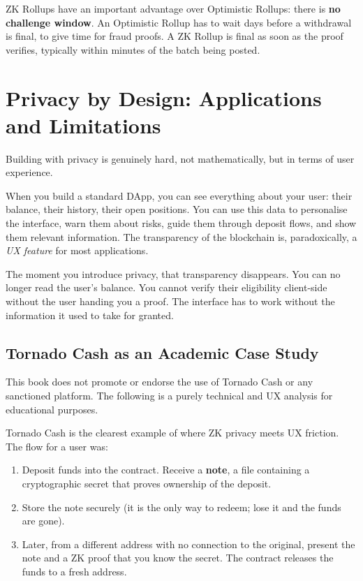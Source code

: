 ZK Rollups have an important advantage over Optimistic Rollups: there is \textbf{no challenge window}. An Optimistic Rollup has to wait days before a withdrawal is final, to give time for fraud proofs. A ZK Rollup is final as soon as the proof verifies, typically within minutes of the batch being posted.

\section{Privacy by Design: Applications and Limitations} \label{sec:privacy-by-design}

Building with privacy is genuinely hard, not mathematically, but in terms of user experience.

When you build a standard DApp, you can see everything about your user: their balance, their history, their open positions. You can use this data to personalise the interface, warn them about risks, guide them through deposit flows, and show them relevant information. The transparency of the blockchain is, paradoxically, a \emph{UX feature} for most applications.

The moment you introduce privacy, that transparency disappears. You can no longer read the user's balance. You cannot verify their eligibility client-side without the user handing you a proof. The interface has to work without the information it used to take for granted.

\subsection*{Tornado Cash as an Academic Case Study}

\begin{remark}
This book does not promote or endorse the use of Tornado Cash or any sanctioned platform. The following is a purely technical and UX analysis for educational purposes.
\end{remark}

Tornado Cash is the clearest example of where ZK privacy meets UX friction. The flow for a user was:

\begin{enumerate}
  \item Deposit funds into the contract. Receive a \textbf{note}, a file containing a cryptographic secret that proves ownership of the deposit.
  \item Store the note securely (it is the only way to redeem; lose it and the funds are gone).
  \item Later, from a different address with no connection to the original, present the note and a ZK proof that you know the secret. The contract releases the funds to a fresh address.
\end{enumerate}

